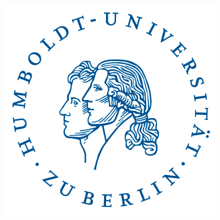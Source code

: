\documentclass[
12pt, %
english, %
onehalfspacing, %
oneside,
headsepline, %
openany
]{MastersDoctoralThesis} %
\author{Fabian Salger} %
\begin{document}
\sloppy
\frontmatter %

\pagestyle{plain} %


\begin{titlepage}
\begin{center}

\vspace*{.01\textheight}

\begin{figure}
\centering
\includegraphics{husiegel}
\end{figure}

{\scshape\LARGE \univname\par}\vspace{1.5cm} %
\textsc{\Large \degreename}\\[0.5cm] %

\HRule \\[0.3cm] %
{\huge \bfseries \ttitle\par}\vspace{0.3cm} %
\HRule \\[1cm] %
 

\end{center}
\end{titlepage}
\end{document}

